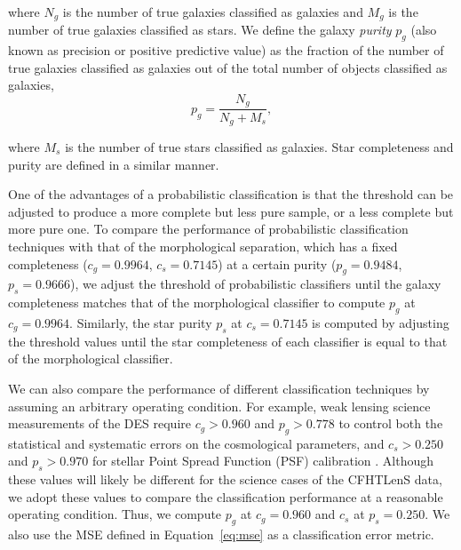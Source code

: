 \documentclass[useAMS,usenatbib]{mn2e}
\begin{document}
\noindent
where $N_g$ is the number of true galaxies classified as galaxies
and $M_g$ is the number of true galaxies classified as stars.
We define the galaxy \textit{purity} $p_g$ (also known as precision
or positive predictive value)
as the fraction of the number of true galaxies classified as galaxies
out of the total number of objects classified as galaxies, 
\begin{equation}
p_g = \frac{N_g}{N_g + M_s},
\end{equation}

\noindent
where $M_s$ is the number of true stars classified as galaxies.
Star completeness and purity are defined in a similar manner.


One of the advantages of a probabilistic classification is
that the threshold can be adjusted to produce
a more complete but less pure sample,
or a less complete but more pure one.
To compare the performance of probabilistic classification techniques
with that of the morphological separation,
which has a fixed completeness ($c_g = 0.9964$, $c_s = 0.7145$)
at a certain purity ($p_g = 0.9484$, $p_s = 0.9666$),
we adjust the threshold of probabilistic classifiers
until the galaxy completeness matches that of the morphological classifier
to compute $p_{g}$ at $c_g=0.9964$.
Similarly, the star purity $p_{s}$ at $c_{s}=0.7145$
is computed by adjusting the threshold values
until the star completeness of each classifier is equal to
that of the morphological classifier.


We can also compare the performance of different classification techniques
by assuming an arbitrary operating condition.
For example, weak lensing science measurements
of the DES require $c_g > 0.960$ and $p_g > 0.778$
to control both the statistical and systematic errors
on the cosmological parameters,
and $c_s > 0.250$ and $p_s > 0.970$
for stellar Point Spread Function (PSF) calibration
\citep{soumagnac2013star}.
Although these values will likely be different
for the science cases of the CFHTLenS data,
we adopt these values to compare the classification performance
at a reasonable operating condition.
Thus, we compute $p_{g}$ at $c_g=0.960$
and $c_{s}$ at $p_s=0.250$.
We also use the MSE defined in Equation~\ref{eq:mse}
as a classification error metric.
\end{document}
